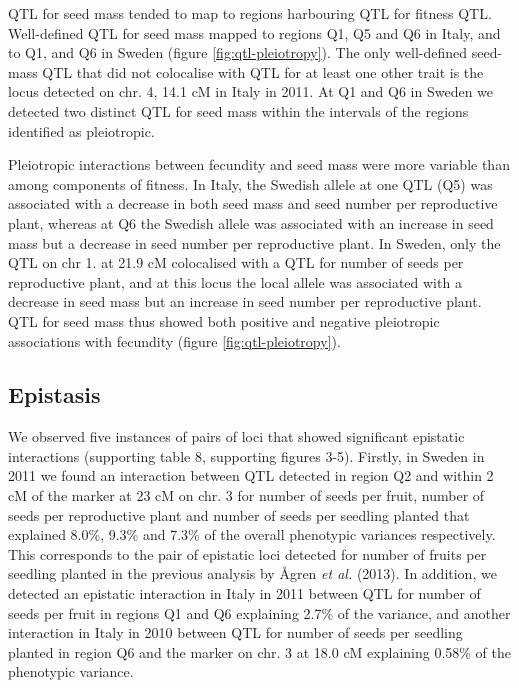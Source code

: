 \documentclass[12pt,]{article}
\begin{document}
QTL for seed mass tended to map to regions harbouring QTL for fitness QTL.
Well-defined QTL for seed mass mapped to regions Q1, Q5 and Q6 in Italy, and to Q1, and Q6 in Sweden (figure \ref{fig:qtl-pleiotropy}).
The only well-defined seed-mass QTL that did not colocalise with QTL for at least one other trait is the locus detected on chr. 4, 14.1 cM in Italy in 2011.
At Q1 and Q6 in Sweden we detected two distinct QTL for seed mass within the intervals of the regions identified as pleiotropic.

Pleiotropic interactions between fecundity and seed mass were more variable than among components of fitness.
In Italy, the Swedish allele at one QTL (Q5) was associated with a decrease in both seed mass and seed number per reproductive plant, whereas at Q6 the Swedish allele was associated with an increase in seed mass but a decrease in seed number per reproductive plant.
In Sweden, only the QTL on chr 1. at 21.9 cM colocalised with a QTL for number of seeds per reproductive plant, and at this locus the local allele was associated with a decrease in seed mass but an increase in seed number per reproductive plant.
QTL for seed mass thus showed both positive and negative pleiotropic associations with fecundity (figure \ref{fig:qtl-pleiotropy}).

\hypertarget{epistasis}{%
\subsection{Epistasis}\label{epistasis}}

We observed five instances of pairs of loci that showed significant epistatic interactions (supporting table 8, supporting figures 3-5).
Firstly, in Sweden in 2011 we found an interaction between QTL detected in region Q2 and within 2 cM of the marker at 23 cM on chr. 3 for number of seeds per fruit, number of seeds per reproductive plant and number of seeds per seedling planted that explained 8.0\%, 9.3\% and 7.3\% of the overall phenotypic variances respectively.
This corresponds to the pair of epistatic loci detected for number of fruits per seedling planted in the previous analysis by Ågren \emph{et al.} (2013).
In addition, we detected an epistatic interaction in Italy in 2011 between QTL for number of seeds per fruit in regions Q1 and Q6 explaining 2.7\% of the variance, and another interaction in Italy in 2010 between QTL for number of seeds per seedling planted in region Q6 and the marker on chr. 3 at 18.0 cM explaining 0.58\% of the phenotypic variance.
\end{document}
